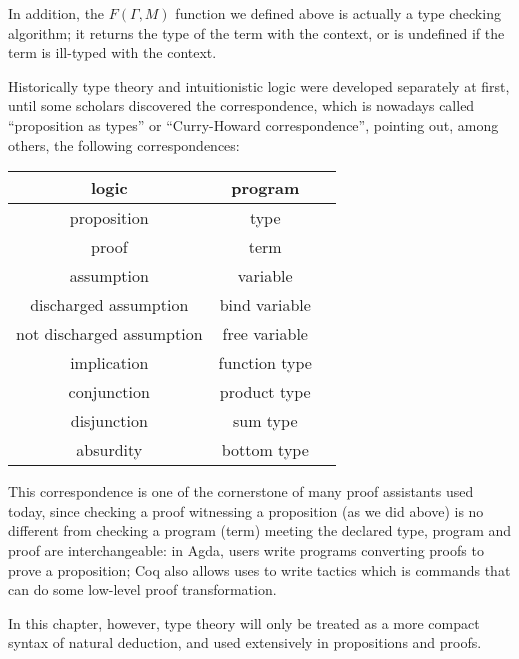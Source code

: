 \documentclass[../../../include/open-logic-section]{subfiles}
\begin{document}
In addition, the $F(\Gamma, M)$ function we defined above is actually
a type checking algorithm; it returns the type of the term with the
context, or is undefined if the term is ill-typed with the context.

Historically type theory and intuitionistic logic were developed
separately at first, until some scholars discovered the
correspondence, which is nowadays called ``proposition as types'' or
``Curry-Howard correspondence'', pointing out, among others, the following
correspondences:
\begin{center}
  \begin{tabular}{c c c}
    logic & program \\
    \hline
    proposition & type \\
    proof & term \\
    assumption & variable \\
    discharged assumption & bind variable \\
    not discharged assumption & free variable \\
    implication & function type \\
    conjunction & product type \\
    disjunction & sum type \\
    absurdity & bottom type \\
    \hline
  \end{tabular}
\end{center}

This correspondence is one of the cornerstone of many proof assistants
used today, since checking a proof witnessing a proposition (as we did above) is no different from checking a
program (term) meeting the declared type, program and proof are interchangeable: in Agda, users
write programs converting proofs to prove a proposition; Coq also allows uses to write tactics
which is commands that can do some low-level proof transformation.

In this chapter, however, type theory will only be treated as a more
compact syntax of natural deduction, and used extensively in
propositions and proofs.
\end{document}
